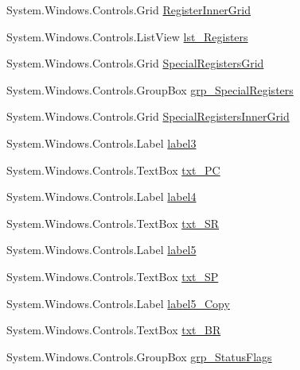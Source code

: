 \begin{DoxyCompactItemize}
\item 
System.\+Windows.\+Controls.\+Grid \hyperlink{class_c_p_u___o_s___simulator_1_1_main_window_a27d2d9e2ed92e2daa444ca8086a0861e}{Register\+Inner\+Grid}
\item 
System.\+Windows.\+Controls.\+List\+View \hyperlink{class_c_p_u___o_s___simulator_1_1_main_window_ae88013c536662328670f206a4cab99b1}{lst\+\_\+\+Registers}
\item 
System.\+Windows.\+Controls.\+Grid \hyperlink{class_c_p_u___o_s___simulator_1_1_main_window_a7ce98e44f9236ca31eb5bf3ed81c3372}{Special\+Registers\+Grid}
\item 
System.\+Windows.\+Controls.\+Group\+Box \hyperlink{class_c_p_u___o_s___simulator_1_1_main_window_a02e4a81d8689928cb1d459fd3c01bfdf}{grp\+\_\+\+Special\+Registers}
\item 
System.\+Windows.\+Controls.\+Grid \hyperlink{class_c_p_u___o_s___simulator_1_1_main_window_aeef1e97d3e7d589fdab51828260c7b5a}{Special\+Registers\+Inner\+Grid}
\item 
System.\+Windows.\+Controls.\+Label \hyperlink{class_c_p_u___o_s___simulator_1_1_main_window_a94cf4fbdaebb09776745893c2bce1126}{label3}
\item 
System.\+Windows.\+Controls.\+Text\+Box \hyperlink{class_c_p_u___o_s___simulator_1_1_main_window_a7100765f8e26fa4c97a76dd445942b97}{txt\+\_\+\+P\+C}
\item 
System.\+Windows.\+Controls.\+Label \hyperlink{class_c_p_u___o_s___simulator_1_1_main_window_a3473dc873d8c8d8f4bba6e83f5684299}{label4}
\item 
System.\+Windows.\+Controls.\+Text\+Box \hyperlink{class_c_p_u___o_s___simulator_1_1_main_window_a9135c01bacd48e517d7cf46f69ea87d2}{txt\+\_\+\+S\+R}
\item 
System.\+Windows.\+Controls.\+Label \hyperlink{class_c_p_u___o_s___simulator_1_1_main_window_a37b18e7542e985a8984375d0b1cf441e}{label5}
\item 
System.\+Windows.\+Controls.\+Text\+Box \hyperlink{class_c_p_u___o_s___simulator_1_1_main_window_ac2427655774b9ca2b4c368651d5cd9de}{txt\+\_\+\+S\+P}
\item 
System.\+Windows.\+Controls.\+Label \hyperlink{class_c_p_u___o_s___simulator_1_1_main_window_aadfe7782d7e25b730849222805a541f9}{label5\+\_\+\+Copy}
\item 
System.\+Windows.\+Controls.\+Text\+Box \hyperlink{class_c_p_u___o_s___simulator_1_1_main_window_a7a878022ed4cb948598d3685dc821a00}{txt\+\_\+\+B\+R}
\item 
System.\+Windows.\+Controls.\+Group\+Box \hyperlink{class_c_p_u___o_s___simulator_1_1_main_window_a9947d1946c8258ea1fb77d860baa7e0f}{grp\+\_\+\+Status\+Flags}

\end{DoxyCompactItemize}
